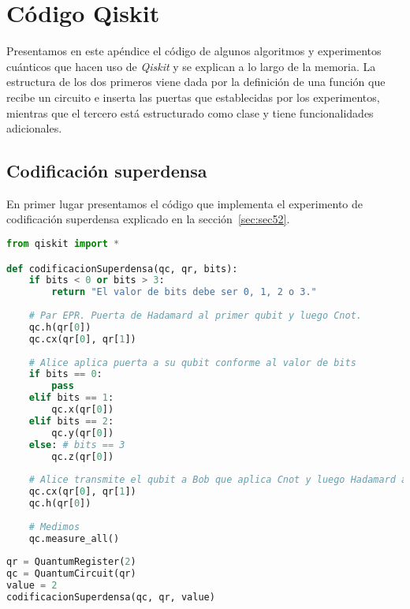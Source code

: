 \chapter{Código Qiskit}
\label{ap:ap1}
Presentamos en este apéndice el código de algunos algoritmos y experimentos cuánticos que hacen uso de \textit{Qiskit} y se explican a lo largo de la memoria. La estructura de los dos primeros viene dada por la definición de una función que recibe un circuito  e inserta las puertas que establecidas por los experimentos, mientras que el tercero está estructurado como clase y tiene funcionalidades adicionales.

\section{Codificación superdensa}
\label{sec:seca1}

En primer lugar presentamos el código que implementa el experimento de codificación superdensa explicado en la sección~\ref{sec:sec52}.
\begin{lstlisting}[language=Python]
from qiskit import *

def codificacionSuperdensa(qc, qr, bits):
    if bits < 0 or bits > 3:
        return "El valor de bits debe ser 0, 1, 2 o 3."
    
    # Par EPR. Puerta de Hadamard al primer qubit y luego Cnot.
    qc.h(qr[0])
    qc.cx(qr[0], qr[1])
    
    # Alice aplica puerta a su qubit conforme al valor de bits
    if bits == 0:
        pass
    elif bits == 1:
        qc.x(qr[0])
    elif bits == 2:
        qc.y(qr[0])
    else: # bits == 3
        qc.z(qr[0])
        
    # Alice transmite el qubit a Bob que aplica Cnot y luego Hadamard al qubit recibido
    qc.cx(qr[0], qr[1])
    qc.h(qr[0])
    
    # Medimos
    qc.measure_all()
    
qr = QuantumRegister(2)
qc = QuantumCircuit(qr)
value = 2
codificacionSuperdensa(qc, qr, value)
\end{lstlisting}

